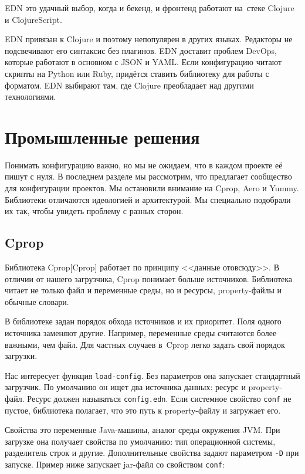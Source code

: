 EDN это удачный выбор, когда и бекенд, и фронтенд работают на~стеке Clojure и
ClojureScript.

EDN привязан к Clojure и поэтому непопулярен в других языках. Редакторы не
подсвечивают его синтаксис без плагинов. EDN доставит проблем DevOps, которые
работают в основном с JSON и YAML. Если конфигурацию читают скрипты на Python
или Ruby, придётся ставить библиотеку для работы с форматом. EDN выбирают там,
где Clojure преобладает над другими технологиями.

\section{Промышленные решения}

Понимать конфигурацию важно, но мы не ожидаем, что в каждом проекте её пишут с
нуля. В последнем разделе мы рассмотрим, что предлагает сообщество для
конфигурации проектов. Мы остановили внимание на Cprop, Aero и Yummy. Библиотеки
отличаются идеологией и архитектурой. Мы специально подобрали их так, чтобы
увидеть проблему с разных сторон.

\subsection{Cprop}


Библиотека Cprop[Cprop] работает по принципу
<<данные отовсюду>>. В отличии от нашего загрузчика, Cprop понимает больше
источников. Библиотека читает не только файл и переменные среды, но и ресурсы,
property-файлы и обычные словари.

В библиотеке задан порядок обхода источников и их приоритет. Поля одного
источника заменяют другие. Например, переменные среды считаются более важными,
чем файл. Для частных случаев в~Cprop легко задать свой порядок загрузки.

Нас интересует функция \verb|load-config|. Без параметров она запускает
стандартный загрузчик. По умолчанию он ищет два источника данных: ресурс и
property-файл. Ресурс должен называться \verb|config.edn|. Если системное
свойство \verb|conf| не пустое, библиотека полагает, что это путь к
property-файлу и загружает его.

Свойства это переменные Java-машины, аналог среды окружения JVM. При загрузке
она получает свойства по умолчанию: тип операционной системы, разделитель строк
и другие. Дополнительные свойства задают параметром \verb|-D| при
запуске. Пример ниже запускает jar-файл со свойством \verb|conf|:

